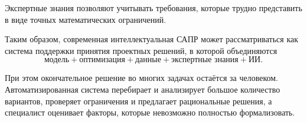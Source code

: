 Экспертные знания позволяют учитывать требования, которые трудно представить в виде точных математических ограничений.

Таким образом, современная интеллектуальная САПР может рассматриваться как система поддержки принятия проектных решений, в которой объединяются
\[
\boxed{
	\text{модель}
	+
	\text{оптимизация}
	+
	\text{данные}
	+
	\text{экспертные знания}
	+
	\text{ИИ}.
}
\]

При этом окончательное решение во многих задачах остаётся за человеком. Автоматизированная система перебирает и анализирует большое количество вариантов, проверяет ограничения и предлагает рациональные решения, а специалист оценивает факторы, которые невозможно полностью формализовать.

\newpage